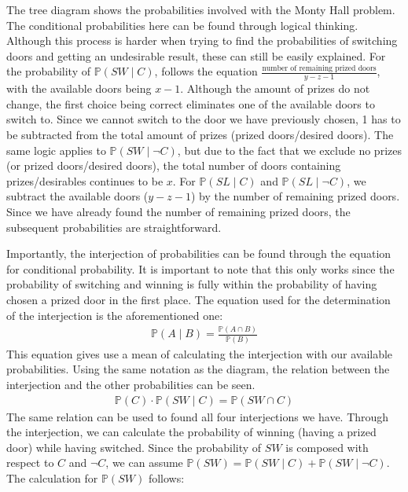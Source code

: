 \documentclass{article}
\begin{document}
The tree diagram shows the probabilities involved with the Monty Hall problem. The conditional probabilities here can be found through logical thinking. Although this process is harder when trying to find the probabilities of switching doors and getting an undesirable result, these can still be easily explained. For the probability of $\mathbb{P}(SW\mid C)$, follows the equation $\frac{\text{number of remaining prized doors}}{y-z-1}$, with the available doors being $x-1$. Although the amount of prizes do not change, the first choice being correct eliminates one of the available doors to switch to. Since we cannot switch to the door we have previously chosen, 1 has to be subtracted from the total amount of prizes (prized doors/desired doors). The same logic applies to $\mathbb{P}(SW\mid\neg C)$, but due to the fact that we exclude no prizes (or prized doors/desired doors), the total number of doors containing prizes/desirables continues to be $x$. For $\mathbb{P}(SL\mid C)$ and $\mathbb{P}(SL\mid\neg C)$, we subtract the available doors ($y-z-1$) by the number of remaining prized doors. Since we have already found the number of remaining prized doors, the subsequent probabilities are straightforward.
\par
Importantly, the interjection of probabilities can be found through the equation for conditional probability. It is important to note that this only works since the probability of switching and winning is fully within the probability of having chosen a prized door in the first place. The equation used for the determination of the interjection is the aforementioned one:
\begin{equation}
\begin{aligned}
\mathbb{P}(A \mid B)=\frac{\mathbb{P}(A \cap B)}{\mathbb{P}(B)}
\end{aligned}
\end{equation}
This equation gives use a mean of calculating the interjection with our available probabilities. Using the same notation as the diagram, the relation between the interjection and the other probabilities can be seen.
\begin{equation}
\begin{aligned}
\mathbb{P}(C)\cdot\mathbb{P}(SW\mid C)=\mathbb{P}(SW \cap C)
\end{aligned}
\end{equation}
The same relation can be used to found all four interjections we have. Through the interjection, we can calculate the probability of winning (having a prized door) while having switched. Since the probability of $SW$ is composed with respect to $C$ and $\neg C$, we can assume $\mathbb{P}(SW)=\mathbb{P}(SW\mid C)+\mathbb{P}(SW\mid\neg C)$. The calculation for $\mathbb{P}(SW)$ follows:
\end{document}
